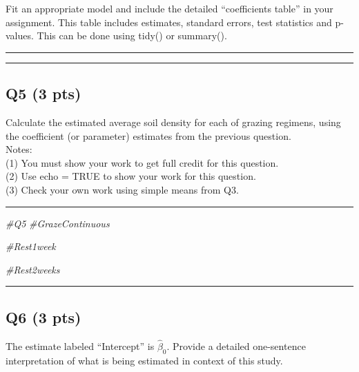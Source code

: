 \documentclass[
]{article}
\newenvironment{Shaded}{\begin{snugshade}}{\end{snugshade}}
\newcommand{\CommentTok}[1]{\textcolor[rgb]{0.56,0.35,0.01}{\textit{#1}}}
\begin{document}
Fit an appropriate model and include the detailed ``coefficients table''
in your assignment. This table includes estimates, standard errors, test
statistics and p-values. This can be done using tidy() or summary().

\begin{center}\rule{0.5\linewidth}{0.5pt}\end{center}

\begin{center}\rule{0.5\linewidth}{0.5pt}\end{center}

\hypertarget{q5-3-pts}{%
\subsection{Q5 (3 pts)}\label{q5-3-pts}}

Calculate the estimated average soil density for each of grazing
regimens, using the coefficient (or parameter) estimates from the
previous question.\\
Notes:\\
(1) You must show your work to get full credit for this question.\\
(2) Use echo = TRUE to show your work for this question.\\
(3) Check your own work using simple means from Q3.

\begin{center}\rule{0.5\linewidth}{0.5pt}\end{center}

\begin{Shaded}
\begin{Highlighting}[]
\CommentTok{\#Q5}
\CommentTok{\#GrazeContinuous }

\CommentTok{\#Rest1week }

\CommentTok{\#Rest2weeks }
\end{Highlighting}
\end{Shaded}

\begin{center}\rule{0.5\linewidth}{0.5pt}\end{center}

\hypertarget{q6-3-pts}{%
\subsection{Q6 (3 pts)}\label{q6-3-pts}}

The estimate labeled ``Intercept'' is \(\hat\beta_0\). Provide a
detailed one-sentence interpretation of what is being estimated in
context of this study.
\end{document}
